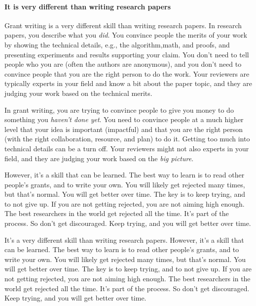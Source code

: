 \documentclass[oneside,11pt,dvipsnames]{book}
\begin{document}
\paragraph{It is very different than writing research papers} Grant writing is a very different skill than writing research papers.  In research papers, you describe what you \emph{did}. You convince people the merits of your work by showing the technical details, e.g., the algorithm,math, and proofs, and presenting experiments and results supporting your claim. You don't need to tell people who you are (often the authors are anonymous), and you don't need to convince people that you are the right person to do the work.  Your reviewers are typically experts in your field and know a bit about the paper topic, and they are judging your work based on the technical merits.

In grant writing, you are trying to convince people to give you money to do something you \emph{haven't done yet}.  You need to convince people at a much higher level that your idea is important (impactful) and that you are the right person (with the right collaboration, resource, and plan) to do it. Getting too much into technical details can be a turn off.  Your reviewers might not also experts in your field, and they are judging your work based on the \emph{big picture}. 


However, it's a skill that can be learned.  The best way to learn is to read other people's grants, and to write your own.  You will likely get rejected many times, but that's normal.  You will get better over time.  The key is to keep trying, and to not give up.  If you are not getting rejected, you are not aiming high enough.  The best researchers in the world get rejected all the time.  It's part of the process.  So don't get discouraged.  Keep trying, and you will get better over time.


It's a very different skill than writing research papers.  However, it's a skill that can be learned.  The best way to learn is to read other people's grants, and to write your own.  You will likely get rejected many times, but that's normal.  You will get better over time.  The key is to keep trying, and to not give up.  If you are not getting rejected, you are not aiming high enough.  The best researchers in the world get rejected all the time.  It's part of the process.  So don't get discouraged.  Keep trying, and you will get better over time.
\end{document}
